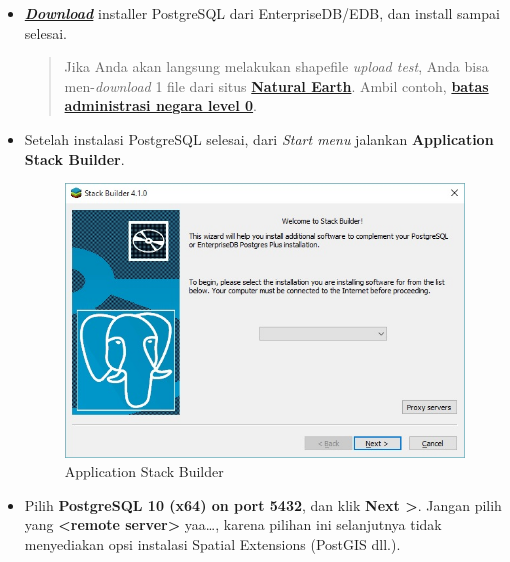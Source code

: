 \documentclass[]{book}
\begin{document}
\begin{itemize}
\item
  \href{https://www.enterprisedb.com/downloads/postgres-postgresql-downloads}{\textbf{\emph{Download}}} installer PostgreSQL dari EnterpriseDB/EDB, dan install sampai selesai.

  \begin{quote}
  Jika Anda akan langsung melakukan shapefile \emph{upload test}, Anda bisa men-\emph{download} 1 file dari situs \href{https://www.naturalearthdata.com/}{\textbf{Natural Earth}}. Ambil contoh, \href{https://www.naturalearthdata.com/http//www.naturalearthdata.com/download/10m/cultural/ne_10m_admin_0_countries.zip}{\textbf{batas administrasi negara level 0}}.
  \end{quote}
\item
  Setelah instalasi PostgreSQL selesai, dari \emph{Start menu} jalankan \textbf{Application Stack Builder}.

  \begin{figure}
  \centering
  \includegraphics{./img/stack-builder-start.jpg}
  \caption{Application Stack Builder}
  \end{figure}
\item
  Pilih \textbf{PostgreSQL 10 (x64) on port 5432}, dan klik \textbf{Next \textgreater{}}. Jangan pilih yang \textbf{\textless{}remote server\textgreater{}} yaa\ldots{}, karena pilihan ini selanjutnya tidak menyediakan opsi instalasi Spatial Extensions (PostGIS dll.).


\end{itemize}
\end{document}
